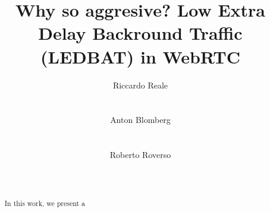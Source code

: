 \documentclass{sig-alternate}
\begin{document}


\title{Why so aggresive? Low Extra Delay Backround Traffic (LEDBAT) in WebRTC}


\author{
\alignauthor
Riccardo Reale\\
      \\
      \\
\alignauthor
Anton Blomberg\\
      \\
      \\
\alignauthor
Roberto Roverso\\
      \\
      \\
}

\newcommand{\mysec}[1]{\vspace*{-0.0cm}\section{#1}}
\newcommand{\mysubsec}[1]{\vspace*{-0.0cm}\subsection{#1}\vspace*{0cm}}
\newcommand{\mysubsubsec}[1]{\vspace*{-0.0cm}\subsubsection{#1}\vspace*{0cm}}
\newcommand{\mypar}[1]{\vspace*{-0cm}\paragraph{#1}\vspace*{0cm}}

\maketitle

\begin{abstract}

In this work, we present a

\end{abstract}
\end{document}
